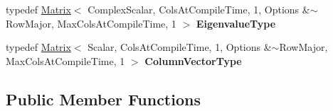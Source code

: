 \begin{DoxyCompactItemize}
\item 
\mbox{\label{class_eigen_1_1_real_schur_aba61940000501482e45b704ca403fa22}} 
typedef \mbox{\hyperlink{class_eigen_1_1_matrix}{Matrix}}$<$ Complex\+Scalar, Cols\+At\+Compile\+Time, 1, Options \&$\sim$Row\+Major, Max\+Cols\+At\+Compile\+Time, 1 $>$ {\bfseries Eigenvalue\+Type}
\item 
\mbox{\label{class_eigen_1_1_real_schur_ad7d4f7f6f061e66838a4a1c7666efa52}} 
typedef \mbox{\hyperlink{class_eigen_1_1_matrix}{Matrix}}$<$ Scalar, Cols\+At\+Compile\+Time, 1, Options \&$\sim$Row\+Major, Max\+Cols\+At\+Compile\+Time, 1 $>$ {\bfseries Column\+Vector\+Type}
\end{DoxyCompactItemize}
\subsection*{Public Member Functions}
